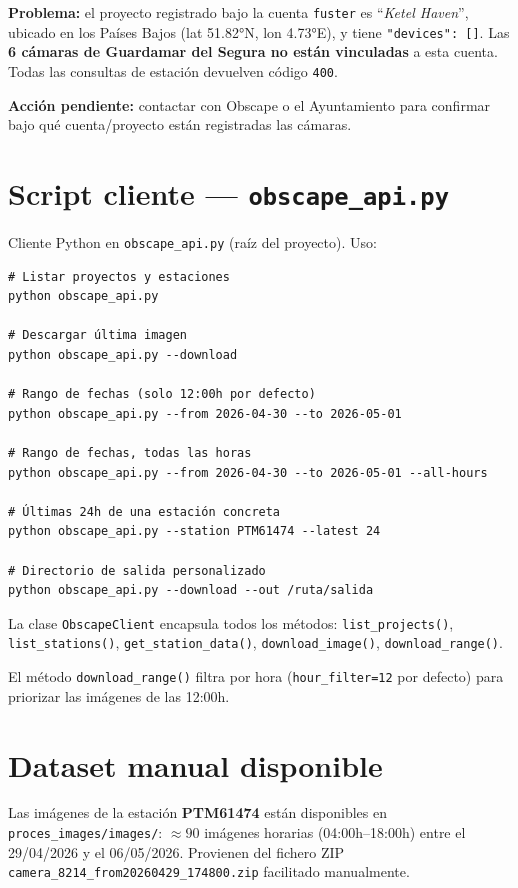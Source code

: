 \textbf{Problema:} el proyecto registrado bajo la cuenta \texttt{fuster} es
``\emph{Ketel Haven}'', ubicado en los Países Bajos
(lat 51.82°N, lon 4.73°E), y tiene \texttt{"devices": []}. Las \textbf{6
cámaras de Guardamar del Segura no están vinculadas} a esta cuenta.
Todas las consultas de estación devuelven código \texttt{400}.

\textbf{Acción pendiente:} contactar con Obscape o el Ayuntamiento para
confirmar bajo qué cuenta/proyecto están registradas las cámaras.

\section{Script cliente --- \texttt{obscape\_api.py}}

Cliente Python en \texttt{obscape\_api.py} (raíz del proyecto). Uso:

\begin{Verbatim}
# Listar proyectos y estaciones
python obscape_api.py

# Descargar última imagen
python obscape_api.py --download

# Rango de fechas (solo 12:00h por defecto)
python obscape_api.py --from 2026-04-30 --to 2026-05-01

# Rango de fechas, todas las horas
python obscape_api.py --from 2026-04-30 --to 2026-05-01 --all-hours

# Últimas 24h de una estación concreta
python obscape_api.py --station PTM61474 --latest 24

# Directorio de salida personalizado
python obscape_api.py --download --out /ruta/salida
\end{Verbatim}

La clase \texttt{ObscapeClient} encapsula todos los métodos:
\texttt{list\_projects()}, \texttt{list\_stations()},
\texttt{get\_station\_data()}, \texttt{download\_image()},
\texttt{download\_range()}.

El método \texttt{download\_range()} filtra por hora
(\texttt{hour\_filter=12} por defecto) para priorizar las imágenes de las 12:00h.

\section{Dataset manual disponible}

Las imágenes de la estación \textbf{PTM61474} están disponibles en
\texttt{proces\_images/images/}: $\approx 90$ imágenes horarias
(04:00h--18:00h) entre el 29/04/2026 y el 06/05/2026.
Provienen del fichero ZIP \texttt{camera\_8214\_from20260429\_174800.zip}
facilitado manualmente.
